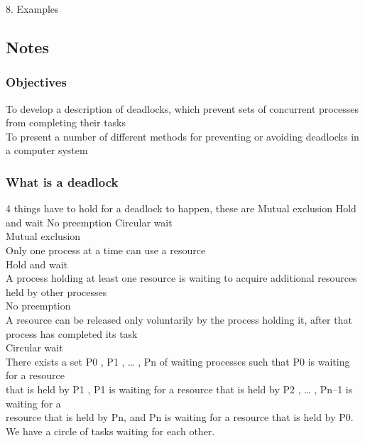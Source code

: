 \documentclass[a4paper,10pt,titlepage]{report}
\begin{document}
8. Examples \\
\newpage


\subsection{Notes}

\subsubsection{Objectives}
To develop a description of deadlocks, which prevent sets of concurrent
processes from completing their tasks\\
To present a number of different methods for preventing or avoiding
deadlocks in a computer system\\
\subsubsection{What is a deadlock}
4 things have to hold for a deadlock to happen, these are Mutual exclusion
Hold and wait
No preemption
Circular wait
\\
Mutual exclusion\\
\hspace{10mm} Only one process at a time can use a resource\\
Hold and wait\\
\hspace{10mm} A process holding at least one resource is waiting to acquire additional
resources held by other processes \\
No preemption\\
\hspace{10mm} A resource can be released only voluntarily by the process holding it, after
that process has completed its task \\ 
Circular wait\\
\hspace{10mm} There exists a set {P0 , P1 , … , Pn } of waiting processes such that P0 is waiting
for a resource \\
\hspace{10mm} that is held by P1 , P1 is waiting for a resource that is held by
P2 , … , Pn–1 is waiting for a \\
\hspace{10mm}resource that is held by Pn, and Pn is waiting for a
resource that is held by P0. \\
\vspace{2mm} 
\hspace{10mm}We have a circle of tasks waiting for each other.
\\
\end{document}
